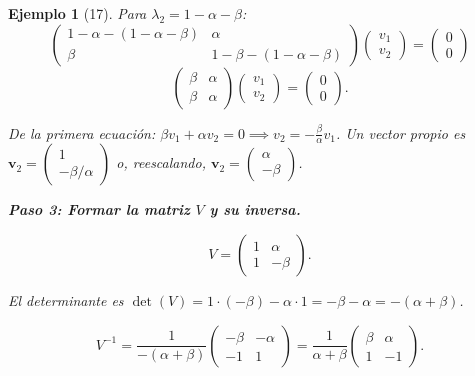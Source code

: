 \documentclass[12pt]{book}
\newtheorem{example}{Ejemplo}[chapter]
\begin{document}
\begin{example}[17]
Para $\lambda_2 = 1 - \alpha - \beta$:
\[
\begin{pmatrix}
1 - \alpha - (1 - \alpha - \beta) & \alpha \\
\beta & 1 - \beta - (1 - \alpha - \beta)
\end{pmatrix} \begin{pmatrix} v_1 \\ v_2 \end{pmatrix} = \begin{pmatrix} 0 \\ 0 \end{pmatrix}
\]
\[
\begin{pmatrix}
\beta & \alpha \\
\beta & \alpha
\end{pmatrix} \begin{pmatrix} v_1 \\ v_2 \end{pmatrix} = \begin{pmatrix} 0 \\ 0 \end{pmatrix}.
\]

De la primera ecuación: $\beta v_1 + \alpha v_2 = 0 \implies v_2 = -\frac{\beta}{\alpha} v_1$. Un vector propio es $\mathbf{v}_2 = \begin{pmatrix} 1 \\ -\beta/\alpha \end{pmatrix}$ o, reescalando, $\mathbf{v}_2 = \begin{pmatrix} \alpha \\ -\beta \end{pmatrix}$.

\textbf{Paso 3: Formar la matriz $V$ y su inversa.}

\[
V = \begin{pmatrix} 1 & \alpha \\ 1 & -\beta \end{pmatrix}.
\]

El determinante es $\det(V) = 1 \cdot (-\beta) - \alpha \cdot 1 = -\beta - \alpha = -(\alpha + \beta)$.

\[
V^{-1} = \frac{1}{-(\alpha + \beta)} \begin{pmatrix} -\beta & -\alpha \\ -1 & 1 \end{pmatrix} = \frac{1}{\alpha + \beta} \begin{pmatrix} \beta & \alpha \\ 1 & -1 \end{pmatrix}.
\]


\end{example}
\end{document}
